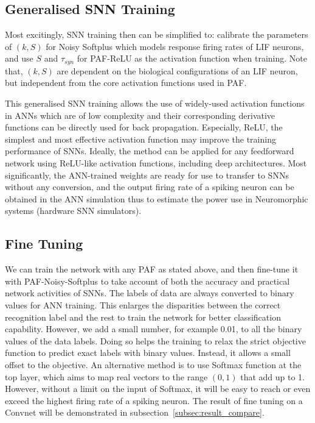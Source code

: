 \documentclass{article}
\begin{document}
	\subsection{Generalised SNN Training}
	\label{subsec:ns_train}
	Most excitingly, SNN training then can be simplified to: calibrate the parameters of $(k, S)$ for Noisy Softplus which models response firing rates of LIF neurons, and use $S$ and $\tau_{syn}$ for PAF-ReLU as the activation function when training.
	Note that, $(k, S)$ are dependent on the biological configurations of an LIF neuron, but independent from the core activation functions used in PAF.
	
	This generalised SNN training allows the use of widely-used activation functions in ANNs which are of low complexity and their corresponding derivative functions can be directly used for back propagation.
	Especially, ReLU, the simplest and most effective activation function may improve the training performance of SNNs.
	Ideally, the method can be applied for any feedforward network using ReLU-like activation functions, including deep architectures.
	Most significantly, the ANN-trained weights are ready for use to transfer to SNNs without any conversion, and the output firing rate of a spiking neuron can be obtained in the ANN simulation thus to estimate the power use in Neuromorphic systems (hardware SNN simulators).
	
	
	
	\subsection{Fine Tuning}
	We can train the network with any PAF as stated above, and then fine-tune it with PAF-Noisy-Softplus to take account of both the accuracy and practical network activities of SNNs.
	The labels of data are always converted to binary values for ANN training.
	This enlarges the disparities between the correct recognition label and the rest to train the network for better classification capability.
	However, we add a small number, for example 0.01, to all the binary values of the data labels.
	Doing so helps the training to relax the strict objective function to predict exact labels with binary values.
	Instead, it allows a small offset to the objective.
	An alternative method is to use Softmax function at the top layer, which aims to map real vectors to the range $(0,1)$ that add up to 1. 
	However, without a limit on the input of Softmax, it will be easy to reach or even exceed the highest firing rate of a spiking neuron.
	The result of fine tuning on a Convnet will be demonstrated in subsection~\ref{subsec:result_compare}.
	
\end{document}
